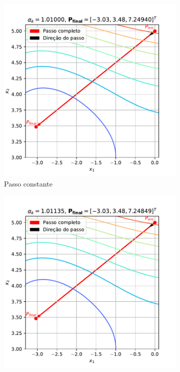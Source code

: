 \documentclass[10pt, a4paper]{article}
\begin{document}
\begin{figure}
  \centering
  \begin{subfigure}[b]{0.32\textwidth}
      \centering
      \includegraphics[width=\textwidth]{images/q2c2_1.pdf}
      \caption{Passo constante}
      \label{fig:q2c2_1}
  \end{subfigure}
  \hfill
  \begin{subfigure}[b]{0.32\textwidth}
      \centering
      \includegraphics[width=\textwidth]{images/q2c2_2.pdf}

\end{subfigure}
\end{figure}
\end{document}
